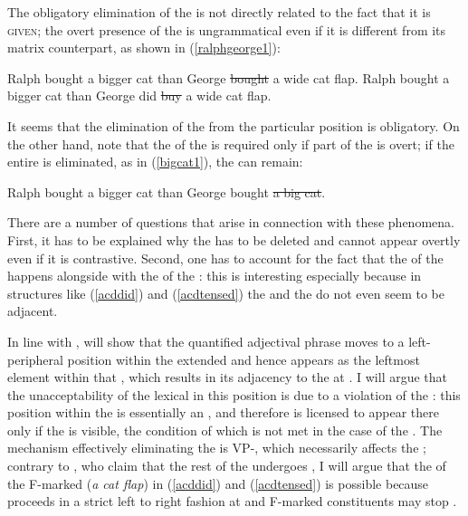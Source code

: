 The obligatory elimination of the  is not directly related to the fact that it is \textsc{given}; the overt presence of the  is ungrammatical even if it is different from its matrix  counterpart, as shown in (\ref{ralphgeorge1}):

\ea \label{ralphgeorge1}
\ea	*Ralph bought a bigger cat than George \sout{bought} a wide cat flap.
\ex	*Ralph bought a bigger cat than George did \sout{buy} a wide cat flap.
\z
\z

It seems that the elimination of the  from the particular position is obligatory. On the other hand, note that the  of the  is required only if part of the  is overt; if the entire  is eliminated, as in (\ref{bigcat1}), the  can remain:

\ea	Ralph bought a bigger cat than George bought \sout{a big cat}. \label{bigcat1}
\z

There are a number of questions that arise in connection with these phenomena. First, it has to be explained why the  has to be deleted and cannot appear overtly even if it is contrastive. Second, one has to account for the fact that the  of the  happens alongside with the  of the : this is interesting especially because in structures like (\ref{acddid}) and (\ref{acdtensed}) the  and the  do not even seem to be adjacent.

In line with \citet{kennedymerchant2000},  will show that the quantified adjectival phrase moves to a left-peripheral position within the extended  and hence appears as the leftmost element within that , which results in its adjacency to the  at . I will argue that the unacceptability of the lexical  in this position is due to a violation of the : this position within the  is essentially an , and therefore  is licensed to appear there only if the  is visible, the condition of which is not met in the case of the . The  mechanism effectively eliminating the  is VP-, which necessarily affects the ; contrary to \citet{kennedymerchant2000}, who claim that the rest of the  undergoes , I will argue that the  of the F-marked  (\textit{a cat flap}) in (\ref{acddid}) and (\ref{acdtensed}) is possible because  proceeds in a strict left to right fashion at  and F-marked constituents may stop .

